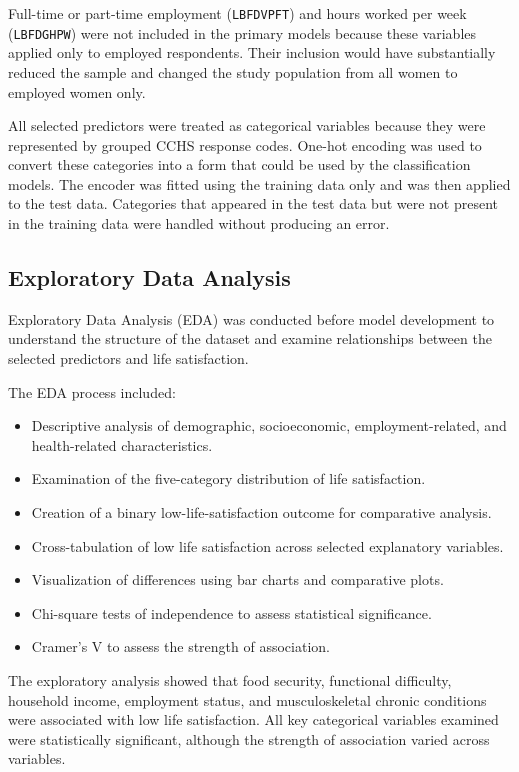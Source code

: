 \documentclass[12pt]{article}
\begin{document}
Full-time or part-time employment (\texttt{LBFDVPFT}) and hours worked per week (\texttt{LBFDGHPW}) were not included in the primary models because these variables applied only to employed respondents. Their inclusion would have substantially reduced the sample and changed the study population from all women to employed women only.

All selected predictors were treated as categorical variables because they were represented by grouped CCHS response codes. One-hot encoding was used to convert these categories into a form that could be used by the classification models. The encoder was fitted using the training data only and was then applied to the test data. Categories that appeared in the test data but were not present in the training data were handled without producing an error.

\subsection{Exploratory Data Analysis}

Exploratory Data Analysis (EDA) was conducted before model development to understand the structure of the dataset and examine relationships between the selected predictors and life satisfaction.

The EDA process included:

\begin{itemize}
\item Descriptive analysis of demographic, socioeconomic, employment-related, and health-related characteristics.
\item Examination of the five-category distribution of life satisfaction.
\item Creation of a binary low-life-satisfaction outcome for comparative analysis.
\item Cross-tabulation of low life satisfaction across selected explanatory variables.
\item Visualization of differences using bar charts and comparative plots.
\item Chi-square tests of independence to assess statistical significance.
\item Cramer's V to assess the strength of association.
\end{itemize}

The exploratory analysis showed that food security, functional difficulty, household income, employment status, and musculoskeletal chronic conditions were associated with low life satisfaction. All key categorical variables examined were statistically significant, although the strength of association varied across variables.
\end{document}
